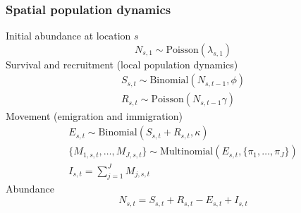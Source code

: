 \documentclass[color=usenames,dvipsnames]{beamer}\usepackage[]{graphicx}\usepackage[]{color}
\begin{document}
\begin{frame}
  \frametitle{Spatial population dynamics}
  \small
  {Initial abundance at location $s$}
  \[
    N_{s,1} \sim \mbox{Poisson}(\lambda_{s,1})
  \]
  \pause \vfill
  Survival and recruitment (local population dynamics)
  \begin{gather*}
    S_{s,t} \sim \mbox{Binomial}(N_{s,t-1}, \phi) \\
    R_{s,t} \sim \mbox{Poisson}(N_{s,t-1} \gamma)
  \end{gather*}
  \pause \vfill
  Movement (emigration and immigration)
  \begin{gather*}
    E_{s,t} \sim \mathrm{Binomial}(S_{s,t}+R_{s,t}, \kappa) \\
    \{M_{1,s,t}, \dots, M_{J,s,t}\} \sim \mathrm{Multinomial}(E_{s,t}, \{\pi_1, \dots, \pi_J\}) \\
    I_{s,t} = \sum_{j=1}^J M_{j,s,t}
  \end{gather*}
  \pause
  {Abundance}
  \[
    N_{s,t} = S_{s,t} + R_{s,t} - E_{s,t} + I_{s,t}
  \]
\end{frame}











\end{document}
